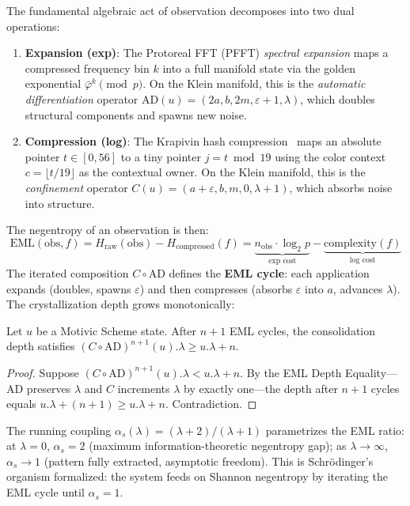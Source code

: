 The fundamental algebraic act of observation decomposes into two dual operations:

\begin{enumerate}
    \item \textbf{Expansion (exp)}: The Protoreal FFT (PFFT) \emph{spectral expansion} maps a compressed frequency bin $k$ into a full manifold state via the golden exponential $\bar\varphi^k \pmod{p}$. On the Klein manifold, this is the \emph{automatic differentiation} operator $\mathrm{AD}(u) = (2a, b, 2m, \varepsilon + 1, \lambda)$, which doubles structural components and spawns new noise.
    \item \textbf{Compression (log)}: The Krapivin hash compression~\cite{krapivin2025optimal} maps an absolute pointer $t \in [0, 56]$ to a tiny pointer $j = t \bmod 19$ using the color context $c = \lfloor t/19 \rfloor$ as the contextual owner. On the Klein manifold, this is the \emph{confinement} operator $C(u) = (a + \varepsilon, b, m, 0, \lambda + 1)$, which absorbs noise into structure.
\end{enumerate}

The negentropy of an observation is then:
\begin{equation}
    \mathrm{EML}(\mathrm{obs}, f) = H_{\mathrm{raw}}(\mathrm{obs}) - H_{\mathrm{compressed}}(f) = \underbrace{n_{\mathrm{obs}} \cdot \log_2 p}_{\text{exp cost}} - \underbrace{\text{complexity}(f)}_{\text{log cost}}
\end{equation}
The iterated composition $C \circ \mathrm{AD}$ defines the \textbf{EML cycle}: each application expands (doubles, spawns $\varepsilon$) and then compresses (absorbs $\varepsilon$ into $a$, advances $\lambda$). The crystallization depth grows monotonically:

\begin{theorem}
\label{thm:monotone_negentropy}
Let $u$ be a Motivic Scheme state. After $n+1$ EML cycles, the consolidation depth satisfies $(C \circ \mathrm{AD})^{n+1}(u).\lambda \geq u.\lambda + n$. 
\end{theorem}
\begin{proof}
Suppose $(C \circ \mathrm{AD})^{n+1}(u).\lambda < u.\lambda + n$. By the EML Depth Equality---$\mathrm{AD}$ preserves $\lambda$ and $C$ increments $\lambda$ by exactly one---the depth after $n+1$ cycles equals $u.\lambda + (n+1) \geq u.\lambda + n$. Contradiction. \qedhere
\end{proof}

The running coupling $\alpha_s(\lambda) = (\lambda + 2)/(\lambda + 1)$ parametrizes the EML ratio: at $\lambda = 0$, $\alpha_s = 2$ (maximum information-theoretic negentropy gap); as $\lambda \to \infty$, $\alpha_s \to 1$ (pattern fully extracted, asymptotic freedom). This is Schr\"odinger's organism formalized: the system feeds on Shannon negentropy by iterating the EML cycle until $\alpha_s = 1$.

